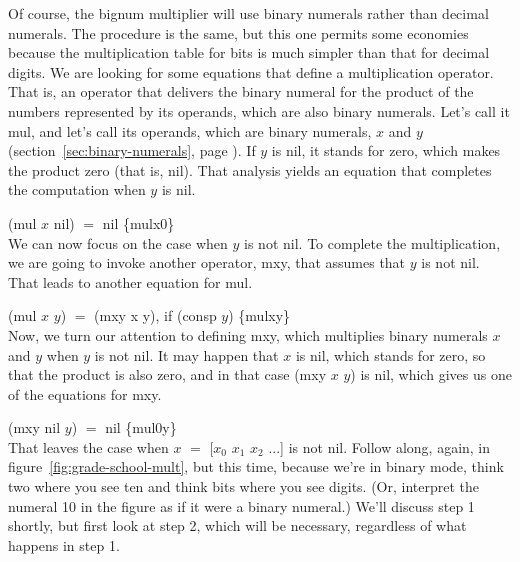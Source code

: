 Of course, the bignum multiplier
will use binary numerals rather than decimal numerals.
The procedure is the same, but this one permits some economies
because the multiplication table for bits is much simpler
than that for decimal digits.
We are looking for some equations that define a multiplication operator.
That is, an operator that delivers the binary numeral for the product of the numbers
represented by its operands, which are also binary numerals.
Let's call it \textsf{mul}, and let's call its operands, which are binary numerals,
$x$ and $y$ (section~\ref{sec:binary-numerals}, page \pageref{sec:binary-numerals}).
If $y$ is nil, it stands for zero,
which makes the product zero (that is, \textsf{nil}).
That analysis yields an equation that completes
the computation when $y$ is \textsf{nil}.

\vspace{2mm}\hspace*{2cm} \textsf{(mul $x$ nil)} $=$ \textsf{nil} \hspace{2cm} \hfill \{mulx0\}\\

We can now focus on the case when $y$ is not \textsf{nil}.
To complete the multiplication,
we are going to invoke another operator, \textsf{mxy},
that assumes that $y$ is not \textsf{nil}.
That leads to another equation for \textsf{mul}.

\vspace{2mm}\hspace*{2cm} \textsf{(mul $x$ $y$)} $=$ \textsf{(mxy x y)}, if \textsf{(consp $y$)} \hfill \{mulxy\}\\

Now, we turn our attention to defining \textsf{mxy}, which multiplies binary
numerals $x$ and $y$ when $y$ is not \textsf{nil}.
It may happen that $x$ is \textsf{nil}, which stands for zero, so that
the product is also zero, and in that case \textsf{(mxy $x$ $y$)} is \textsf{nil},
which gives us one of the equations for \textsf{mxy}.

\vspace{2mm}\hspace*{2cm} \textsf{(mxy nil $y$)} $=$ \textsf{nil}  \hfill \{mul0y\}\\

That leaves the case when $x$ $=$ \textsf{[$x_0$ $x_1$ $x_2$ ...]} is not \textsf{nil}.
Follow along, again, in figure~\ref{fig:grade-school-mult},
but this time, because we're in binary mode, think two where you see ten
and think bits where you see digits. (Or, interpret the numeral 10
in the figure as if it were a binary numeral.)
We'll discuss step 1 shortly, but first look at step 2,
which will be necessary, regardless of what happens in step 1.

